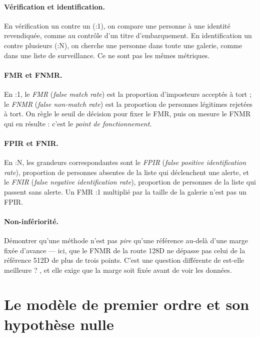 \documentclass[11pt,a4paper]{article}
\newcommand{\terme}[1]{\emph{#1}}
\newcommand{\unun}{{\NoAutoSpacing 1:1}}
\newcommand{\unN}{{\NoAutoSpacing 1:N}}
\begin{document}
\paragraph{Vérification et identification.} En vérification \og un contre un \fg{}
(\unun), on compare une personne à une identité revendiquée, comme au contrôle d'un
titre d'embarquement. En identification \og un contre plusieurs \fg{} (\unN), on
cherche une personne dans toute une galerie, comme dans une liste de surveillance.
Ce ne sont pas les mêmes métriques.

\paragraph{FMR et FNMR.} En \unun, le \terme{FMR} (\emph{false match rate}) est la
proportion d'imposteurs acceptés à tort ; le \terme{FNMR} (\emph{false non-match
rate}) est la proportion de personnes légitimes rejetées à tort. On règle le seuil
de décision pour fixer le FMR, puis on mesure le FNMR qui en résulte : c'est le
\terme{point de fonctionnement}.

\paragraph{FPIR et FNIR.} En \unN, les grandeurs correspondantes sont le \terme{FPIR}
(\emph{false positive identification rate}), proportion de personnes absentes de la
liste qui déclenchent une alerte, et le \terme{FNIR} (\emph{false negative
identification rate}), proportion de personnes de la liste qui passent sans
alerte. Un FMR \unun{} multiplié par la taille de la galerie n'est pas un FPIR.

\paragraph{Non-infériorité.} Démontrer qu'une méthode n'est pas \emph{pire} qu'une
référence au-delà d'une marge fixée d'avance — ici, que le FNMR de la route 128D ne
dépasse pas celui de la référence 512D de plus de trois points. C'est une question
différente de \og est-elle meilleure ? \fg, et elle exige que la marge soit fixée
avant de voir les données.

\section{Le modèle de premier ordre et son hypothèse nulle}\label{sec:modele}
\end{document}
